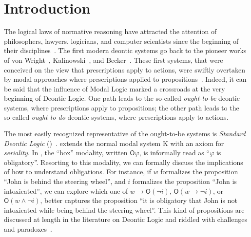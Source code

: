 \section{Introduction}\label{section:introduction}

The logical laws of normative reasoning have attracted the attention of philosophers, lawyers, logicians, and computer scientists since the beginning of their disciplines~\cite{Gabbay:2013}.
The first modern deontic systems go back to the pioneer
works of von Wright~\cite{vonWright:1951},
Kalinowski~\cite{Kalinowski53}, and Becker~\cite{Becker52}.
These first systems, that were conceived on the view that prescriptions apply to actions, were swiftly overtaken by modal approaches where prescriptions applied to propositions~\cite{blac:moda00}.
Indeed, it can be said that the influence of Modal Logic marked a crossroads at the very beginning of Deontic Logic.
One path leads to the so-called \emph{ought-to-be} deontic systems, where prescriptions apply to propositions; the other path leads to the so-called \emph{ought-to-do} deontic systems, where prescriptions apply to actions.



The most easily recognized representative of the ought-to-be systems is \emph{Standard Deontic Logic} (\SDL)~\cite{Aqvist:2002}.
\SDL extends the normal modal system \textsf{K} with an axiom for \emph{seriality}.
In \SDL, the ``box'' modality, written $\mathsf{O}\varphi$, is informally read as ``$\varphi$ is obligatory''.
Resorting to this modality, we can formally discuss the implications of how to understand obligations.
For instance, if $w$ formalizes the proposition ``John is behind the steering wheel'', and $i$ formalizes the proposition ``John is intoxicated'', we can explore which one of $w \to \mathsf{O}(\lnot i)$, $\mathsf{O}(w \to \lnot i)$, or $\mathsf{O}(w \land \lnot i)$, better captures the proposition ``it is obligatory that John is not intoxicated while being behind the steering wheel''.
This kind of propositions are discussed at length in the literature on Deontic Logic and riddled with challenges and paradoxes~\cite{Aqvist:2002}.

